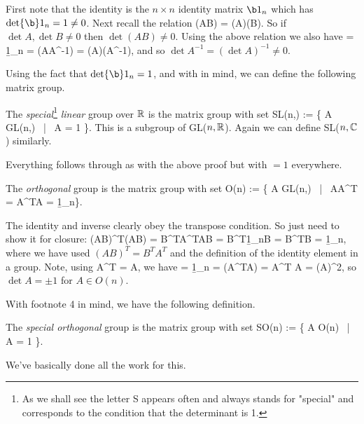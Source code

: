 \bq 
    First note that the identity is the $n\times n$ identity matrix $\b1_n$ which has $\det \b1_n = 1 \neq 0$. Next recall the relation
    \bse 
        \det(AB) = \det(A)\det(B).
    \ese 
    So if $\det A, \det B \neq 0$ then $\det(AB)\neq 0$. Using the above relation we also have 
     = \det\b1_n = \det(AA^{-1}) = \det(A)\det(A^{-1}),
    \ese
    and so $\det A^{-1} = (\det A)^{-1} \neq 0$.
\eq 

Using the fact that $\det\b1_n = 1$, and with  in mind, we can define the following matrix group. 

    The \textit{special}\footnote{As we shall see the letter S appears often and always stands for "special" and corresponds to the condition that the determinant is 1.} \textit{linear} group over $\mathbb{R}$ is the matrix group with set 
    \bse 
        SL(n,\R) := \big\{ A \in GL(n,\R) \, | \, \det A = 1 \big\}. 
    \ese 
    This is a subgroup of GL($n,\mathbb{R}$). Again we can define SL($n,\mathbb{C}$) similarly. 
\ed 

\bq 
    Everything follows through as with the above proof but with $=1$ everywhere.
\eq 

    The \textit{orthogonal} group is the matrix group with set 
    \bse 
        O(n) := \big\{ A \in GL(n,\R) \, | \, AA^T = A^TA = \b1_n\big\}. 
    \ese 
\ed 

\bq 
    The identity and inverse clearly obey the transpose condition. So just need to show it for closure:
    \bse 
        (AB)^T(AB) = B^TA^TAB = B^T\b1_nB = B^TB = \b1_n,
    \ese 
    where we have used $(AB)^T = B^TA^T$ and the definition of the identity element in a group. Note, using 
    \bse 
        \det A^T = \det A,
    \ese 
    we have 
     = \det \b1_n = \det(A^TA) = \det A^T \det A = (\det A)^2,
    \ese 
    so $\det A = \pm 1$ for $A\in O(n)$.
\eq 

With footnote 4 in mind, we have the following definition.

    The \textit{special orthogonal} group is the matrix group with set 
    \be 
    \label{eqn:SO(n)}
        SO(n) := \big\{ A \in O(n) \, | \, \det A = 1 \big\}.
    \ee 
\ed 

\bq 
    We've basically done all the work for this. 
\eq 

